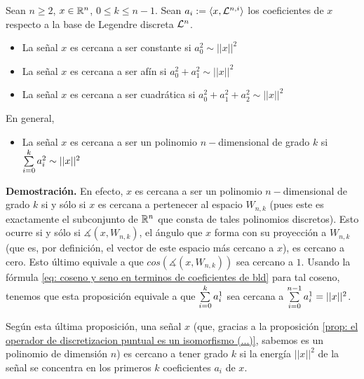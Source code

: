 \begin{prop}
Sean $n \geq 2$, $x \in \mathbb{R}^{n}$, $0 \leq k \leq n-1$.
Sean $a_{i} := \langle x, \mathcal{L}^{n,i} \rangle$ los coeficientes
de $x$ respecto a la base de Legendre discreta $\mathcal{L}^{n}$.
\begin{itemize}
	\item La señal $x$ es cercana a ser constante si
	$a_{0}^{2} \sim ||x||^{2}$
	\item La señal $x$ es cercana a ser afín si
	$a_{0}^{2} + a_{1}^{2} \sim ||x||^{2}$
	\item  La señal $x$ es cercana a ser cuadrática si
	$a_{0}^{2} + a_{1}^{2} + a_{2}^{2} \sim ||x||^{2}$
\end{itemize}
En general,
\begin{itemize}
	\item La señal $x$ es cercana a ser un polinomio $n-$dimensional
	de grado $k$ si
	$\sum\limits_{i=0}^{k}a_{i}^{2} \sim ||x||^{2}$
\end{itemize}
\end{prop}
\noindent
\textbf{Demostración.}
En efecto, $x$ es cercana a ser un polinomio $n-$dimensional
de grado $k$ si y sólo si $x$ es cercana a pertenecer al espacio
$W_{n,k}$ (pues este es exactamente el subconjunto de $\mathbb{R}^{n}$
que consta de tales polinomios discretos). Esto ocurre si y sólo si
$\measuredangle(x, W_{n,k})$, el ángulo que $x$ forma con su proyección
a $W_{n,k}$ (que es, por definición, el vector de este espacio
más cercano a $x$), es cercano a cero. Esto último equivale a que
$cos(\measuredangle(x, W_{n,k}))$ sea cercano a $1$. Usando la fórmula 
\eqref{eq: coseno y seno en terminos de coeficientes de bld}
para tal coseno, tenemos que esta proposición equivale a que
$\sum\limits_{i=0}^{k}a_{i}^{1}$ sea cercana a 
$\sum\limits_{i=0}^{n-1}a_{i}^{1} = ||x||^{2}$.
\QEDB
\vspace{0.2cm}

Según esta última proposición, una señal $x$ 
(que, gracias a la proposición
\ref{prop: el operador de discretizacion puntual es un isomorfismo (...)},
sabemos es un polinomio de dimensión $n$)
es cercano a tener grado $k$ si la energía
$||x||^{2}$ de la señal se concentra en los primeros
$k$ coeficientes $a_{i}$ de $x$. 


